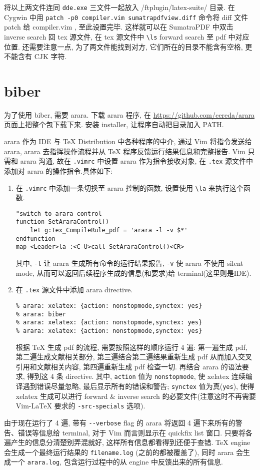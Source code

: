 \documentclass{article}
\begin{document}
将以上两文件连同 \verb|dde.exe| 三文件一起放入 /ftplugin/latex-suite/ 目录.
在 Cygwin 中用 \verb|patch -p0 compiler.vim sumatrapdfview.diff| 命令将 diff 文件 patch 给 compiler.vim , 至此设置完毕. 
这样就可以在 SumatraPDF 中双击 inverse search 回 tex 源文件, 在 tex 源文件中 \verb|\ls| forward search 至 pdf 中对应位置. 还需要注意一点, 为了两文件能找到对方, 它们所在的目录不能含有空格, 更不能含有 CJK 字符.
\part{biber}
为了使用 biber, 需要 arara.
下载 arara 程序, 在 \url{https://github.com/cereda/arara} 页面上把整个包下载下来. 安装 installer, 让程序自动把目录加入 PATH. 

arara 作为 IDE 与 TeX Distribution 中各种程序的中介, 通过 Vim 将指令发送给 arara, arara 去指挥操作流程并从 TeX 程序反馈运行结果信息和完整报告.
Vim 只需和 arara 沟通, 故在 \verb|.vimrc| 中设置 arara 作为指令接收对象, 在 \verb|.tex| 源文件中添加对 arara 的操作指令.具体如下:
\begin{enumerate}
  \item 在 \verb|.vimrc| 中添加一条切换至 arara 控制的函数, 设置使用 \verb|\la| 来执行这个函数. 
    \begin{verbatim}
"switch to arara control
function SetAraraControl()
	let g:Tex_CompileRule_pdf = 'arara -l -v $*'
endfunction
map <Leader>la :<C-U>call SetAraraControl()<CR>
    \end{verbatim}
    其中, \verb|-l| 让 arara 生成所有命令的运行结果报告, \verb|-v| 使 arara 不使用 silent mode, 从而可以返回后续程序生成的信息(和要求)给 terminal(这里则是IDE).
  \item 在 \verb|.tex| 源文件中添加 arara directive.
    \begin{verbatim}
% arara: xelatex: {action: nonstopmode,synctex: yes}
% arara: biber
% arara: xelatex: {action: nonstopmode,synctex: yes}
% arara: xelatex: {action: nonstopmode,synctex: yes}
    \end{verbatim}
    根据 TeX 生成 pdf 的流程, 需要按照这样的顺序运行 4 遍: 第一遍生成 pdf, 第二遍生成文献相关部分, 第三遍结合第二遍结果重新生成 pdf 从而加入交叉引用和文献相关内容, 第四遍重新生成 pdf 检查一切.
    再结合 arara 的语法要求, 得到这 4 条 directive. 其中, \verb|action| 值为 \verb|nonstopmode|, 使 xelatex 连续编译遇到错误尽量忽略, 最后显示所有的错误和警告; \verb|synctex| 值为真(\verb|yes|), 使得 xelatex 生成可以进行 forward \& inverse search 的必要文件(注意这时不再需要 Vim-LaTeX 要求的 \verb|-src-specials| 选项). 
\end{enumerate}
由于现在运行了 4 遍, 带有 \verb|--verbose| flag 的 arara 将返回 4 遍下来所有的警告、错误等信息给 terminal, 对于 Vim 而言则显示在 quickfix list 窗口. 只要将各遍产生的信息分清楚别弄混就好, 这样所有信息都看得到还便于查错. 
TeX engine 会生成一个最终运行结果的 \verb|filename.log| (之前的都被覆盖了), 同时 arara 会生成一个 \verb|arara.log|, 包含运行过程中的从 engine 中反馈出来的所有信息.
\end{document}
